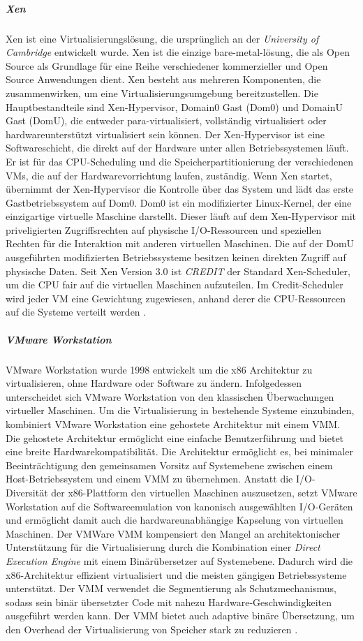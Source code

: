 \subparagraph {Xen}
Xen ist eine Virtualisierungslösung, die ursprünglich an der \emph{University of Cambridge} entwickelt wurde. Xen ist die einzige bare-metal-lösung, die als Open Source als Grundlage für eine Reihe verschiedener kommerzieller und Open Source Anwendungen dient. Xen besteht aus mehreren Komponenten, die zusammenwirken, um eine Virtualisierungsumgebung bereitzustellen. Die Hauptbestandteile sind Xen-Hypervisor, Domain0 Gast (Dom0) und DomainU Gast (DomU), die entweder para-virtualisiert, vollständig virtualisiert oder hardwareunterstützt virtualisiert sein können. Der Xen-Hypervisor ist eine Softwareschicht, die direkt auf der Hardware unter allen Betriebssystemen läuft. Er ist für das CPU-Scheduling und die Speicherpartitionierung der verschiedenen VMs, die auf der Hardwarevorrichtung laufen, zuständig. Wenn Xen startet, übernimmt der Xen-Hypervisor die Kontrolle über das System und lädt das erste Gastbetriebssystem auf Dom0. Dom0 ist ein modifizierter Linux-Kernel, der eine einzigartige virtuelle Maschine darstellt. Dieser läuft auf dem Xen-Hypervisor mit priveligierten Zugriffsrechten auf physische I/O-Ressourcen und speziellen Rechten für die Interaktion mit anderen virtuellen Maschinen. Die auf der DomU ausgeführten modifizierten Betriebssysteme besitzen keinen direkten Zugriff auf physische Daten. Seit Xen Version 3.0 ist \emph{CREDIT} der Standard Xen-Scheduler, um die CPU fair auf die virtuellen Maschinen aufzuteilen. Im Credit-Scheduler wird jeder VM eine Gewichtung zugewiesen, anhand derer die CPU-Ressourcen auf die Systeme verteilt werden \cite{Fayyad-Kazan2013BenchmarkingHypervisors}. 

\subparagraph {VMware Workstation}
VMware Workstation wurde 1998 entwickelt um die x86 Architektur zu virtualisieren, ohne Hardware oder Software zu ändern. Infolgedessen unterscheidet sich VMware Workstation von den klassischen Überwachungen virtueller Maschinen. Um die Virtualisierung in bestehende Systeme einzubinden, kombiniert VMware Workstation eine gehostete Architektur mit einem  VMM. Die gehostete Architektur ermöglicht eine einfache Benutzerführung und bietet eine breite Hardwarekompatibilität. Die Architektur ermöglicht es, bei minimaler Beeinträchtigung den gemeinsamen Vorsitz auf Systemebene zwischen einem Host-Betriebssystem und einem VMM zu übernehmen. Anstatt die I/O-Diversität der x86-Plattform den virtuellen Maschinen auszusetzen, setzt VMware Workstation auf die Softwareemulation von kanonisch ausgewählten I/O-Geräten und ermöglicht damit auch die hardwareunabhängige Kapselung von virtuellen Maschinen. Der VMWare VMM kompensiert den Mangel an architektonischer Unterstützung für die Virtualisierung durch die Kombination einer \emph{Direct Execution Engine} mit einem Binärübersetzer auf Systemebene. Dadurch wird die x86-Architektur effizient  virtualisiert und die meisten gängigen Betriebssysteme  unterstützt. Der VMM verwendet die Segmentierung als Schutzmechanismus, sodass sein binär übersetzter Code mit nahezu Hardware-Geschwindigkeiten ausgeführt werden kann. Der VMM bietet auch adaptive binäre Übersetzung, um den Overhead der Virtualisierung von Speicher stark zu reduzieren \cite{Bugnion2012BringingWorkstation}.


